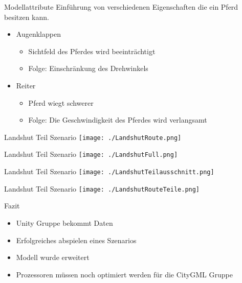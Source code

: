 \begin{frame}{Modellattribute}
Einführung von verschiedenen Eigenschaften die ein Pferd besitzen kann.
\begin{itemize}
	\item Augenklappen
	\begin{itemize}
		\item Sichtfeld des Pferdes wird beeinträchtigt
		\item Folge: Einschränkung des Drehwinkels
	\end{itemize}
	\item Reiter
	\begin{itemize}
		\item Pferd wiegt schwerer
		\item Folge: Die Geschwindigkeit des Pferdes wird verlangsamt
	\end{itemize}
\end{itemize}
\end{frame}

\begin{frame}{Landshut Teil Szenario}
	\texttt{[image: ./LandshutRoute.png]}
\end{frame}

\begin{frame}{Landshut Teil Szenario}
	\texttt{[image: ./LandshutFull.png]}
\end{frame}

\begin{frame}{Landshut Teil Szenario}
	\texttt{[image: ./LandshutTeilausschnitt.png]}
\end{frame}

\begin{frame}{Landshut Teil Szenario}
	\texttt{[image: ./LandshutRouteTeile.png]}
\end{frame}

\begin{frame}{Fazit}
	\begin{itemize}
		\item Unity Gruppe bekommt Daten
		\item Erfolgreiches abspielen eines Szenarios
		\item Modell wurde erweitert
		\item Prozessoren müssen noch optimiert werden für die CityGML Gruppe
	\end{itemize}
\end{frame}

